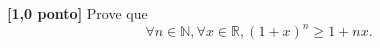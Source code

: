 {\bf [1,0 ponto]} Prove que
\[
	\forall n\in\mathbb{N},\forall x\in\mathbb{R}, (1+x)^n\geq 1+nx.
\]
